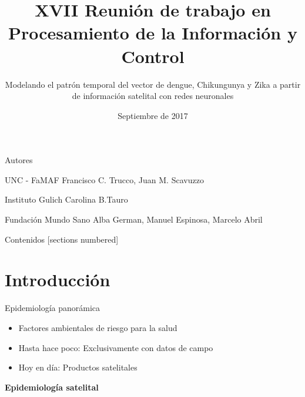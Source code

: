 \documentclass[10pt]{beamer}
\title{XVII Reunión de trabajo en Procesamiento de la Información y Control}
\subtitle{Modelando el patrón temporal del vector de dengue, Chikungunya y Zika
  a partir de información satelital con redes neuronales}
\date{Septiembre de 2017}
\begin{document}
\maketitle

\begin{frame}{Autores}
	\begin{alertblock}{UNC - FaMAF}
    Francisco C. Trucco, Juan M. Scavuzzo
	\end{alertblock}

	\begin{alertblock}{Instituto Gulich}
    Carolina B.Tauro
	\end{alertblock}

	\begin{alertblock}{Fundación Mundo Sano}
    Alba German, Manuel Espinosa, Marcelo Abril
	\end{alertblock}
\end{frame}

\begin{frame}{Contenidos}
  [sections numbered]
  \tableofcontents[hideallsubsections]
\end{frame}

\section{Introducción}

\begin{frame}{Epidemiología panorámica}

  \begin{itemize}
  \item Factores ambientales de riesgo para la salud
  \item Hasta hace poco: Exclusivamente con datos de campo
  \item Hoy en día: Productos satelitales
  \end{itemize}

  \begin{itemize}
    \begin{center}
      \textbf{Epidemiología satelital}
    \end{center}
  \end{itemize}

\end{frame}
\end{document}
